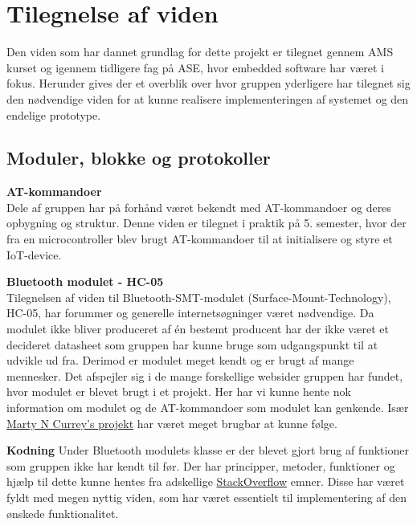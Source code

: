 \graphicspath{{Chapters/Alternative/}}


\section{Tilegnelse af viden}

Den viden som har dannet grundlag for dette projekt er tilegnet gennem AMS kurset og igennem tidligere fag på ASE, hvor embedded software har været i fokus. Herunder gives der et overblik over hvor gruppen yderligere har tilegnet sig den nødvendige viden for at kunne realisere implementeringen af systemet og den endelige prototype.

\subsection{Moduler, blokke og protokoller}
  
\textbf{AT-kommandoer} \\
Dele af gruppen har på forhånd været bekendt med AT-kommandoer og deres opbygning og struktur. Denne viden er tilegnet i praktik på 5. semester, hvor der fra en microcontroller blev brugt AT-kommandoer til at initialisere og styre et IoT-device.

\textbf{Bluetooth modulet - HC-05}\\
Tilegnelsen af viden til Bluetooth-SMT-modulet (Surface-Mount-Technology), HC-05, har forummer og generelle internetsøgninger været nødvendige. Da modulet ikke bliver produceret af én bestemt producent har der ikke været et decideret datasheet som gruppen har kunne bruge som udgangspunkt til at udvikle ud fra. Derimod er modulet meget kendt og er brugt af mange mennesker. Det afspejler sig i de mange forskellige websider gruppen har fundet, hvor modulet er blevet brugt i et projekt. Her har vi kunne hente nok information om modulet og de AT-kommandoer som modulet kan genkende.
Især \href{http://www.martyncurrey.com/arduino-with-hc-05-bluetooth-module-at-mode/}{Marty N Currey's projekt} har været meget brugbar at kunne følge.

\textbf{Kodning}
Under Bluetooth modulets klasse er der blevet gjort brug af funktioner som gruppen ikke har kendt til før. Der har principper, metoder, funktioner og hjælp til dette kunne hentes fra adskellige \href{https://stackoverflow.com}{StackOverflow} emner. Disse har været fyldt med megen nyttig viden, som har været essentielt til implementering af den ønskede funktionalitet.

